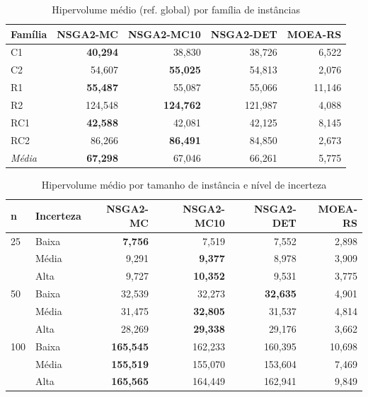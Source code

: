 \begin{table}[ht]
\centering
\caption{Hipervolume médio (ref. global) por família de instâncias}
\label{tab:hv_familia}
\begin{tabular}{lrrrr}
\toprule
\textbf{Família} & \textbf{NSGA2-MC} & \textbf{NSGA2-MC10} & \textbf{NSGA2-DET} & \textbf{MOEA-RS} \\
\midrule
C1 & \textbf{40,294} & 38,830 & 38,726 & 6,522 \\
C2 & 54,607 & \textbf{55,025} & 54,813 & 2,076 \\
R1 & \textbf{55,487} & 55,087 & 55,066 & 11,146 \\
R2 & 124,548 & \textbf{124,762} & 121,987 & 4,088 \\
RC1 & \textbf{42,588} & 42,081 & 42,125 & 8,145 \\
RC2 & 86,266 & \textbf{86,491} & 84,850 & 2,673 \\
\midrule
\textit{Média} & \textbf{67,298} & 67,046 & 66,261 & 5,775 \\
\bottomrule
\end{tabular}
\end{table}

\begin{table}[ht]
\centering
\caption{Hipervolume médio por tamanho de instância e nível de incerteza}
\label{tab:hv_tamanho}
\begin{tabular}{llrrrr}
\toprule
\textbf{n} & \textbf{Incerteza} & \textbf{NSGA2-MC} & \textbf{NSGA2-MC10} & \textbf{NSGA2-DET} & \textbf{MOEA-RS} \\
\midrule
25 & Baixa & \textbf{7,756} & 7,519 & 7,552 & 2,898 \\
 & Média & 9,291 & \textbf{9,377} & 8,978 & 3,909 \\
 & Alta & 9,727 & \textbf{10,352} & 9,531 & 3,775 \\
\midrule
50 & Baixa & 32,539 & 32,273 & \textbf{32,635} & 4,901 \\
 & Média & 31,475 & \textbf{32,805} & 31,537 & 4,814 \\
 & Alta & 28,269 & \textbf{29,338} & 29,176 & 3,662 \\
\midrule
100 & Baixa & \textbf{165,545} & 162,233 & 160,395 & 10,698 \\
 & Média & \textbf{155,519} & 155,070 & 153,604 & 7,469 \\
 & Alta & \textbf{165,565} & 164,449 & 162,941 & 9,849 \\
\midrule
\bottomrule
\end{tabular}
\end{table}

